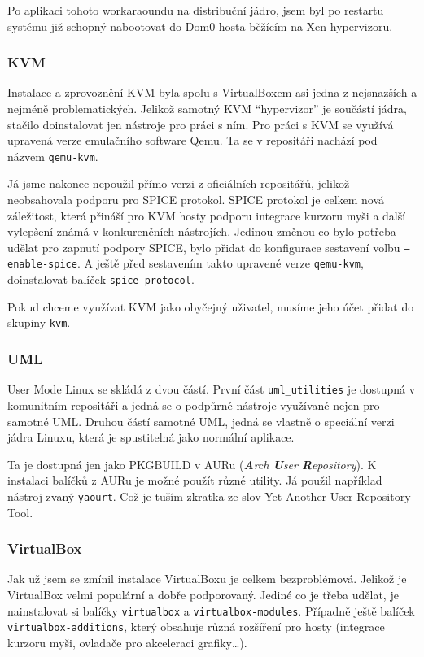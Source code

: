 Po aplikaci tohoto workaraoundu na distribuční jádro, jsem byl po restartu systému již schopný nabootovat do Dom0 hosta běžícím na Xen hypervizoru.

\subsubsection{KVM}
Instalace a zprovoznění KVM byla spolu s VirtualBoxem asi jedna z nejsnazších a nejméně problematických. Jelikož samotný KVM "`hypervizor"' je součástí jádra, stačilo doinstalovat jen nástroje pro práci s ním. Pro práci s KVM se využívá upravená verze emulačního software Qemu. Ta se v repositáři nachází pod názvem \texttt{qemu-kvm}.

Já jsme nakonec nepoužil přímo verzi z oficiálních repositářů, jelikož neobsahovala podporu pro SPICE protokol. SPICE protokol je celkem nová záležitost, která přináší pro KVM hosty podporu integrace kurzoru myši a další vylepšení známá v konkurenčních nástrojích. Jedinou změnou co bylo potřeba udělat pro zapnutí podpory SPICE, bylo přidat do konfigurace sestavení volbu \texttt{---enable-spice}. A ještě před sestavením takto upravené verze \texttt{qemu-kvm}, doinstalovat balíček \texttt{spice-protocol}.

Pokud chceme využívat KVM jako obyčejný uživatel, musíme jeho účet přidat do skupiny \texttt{kvm}.

\subsubsection{UML}
User Mode Linux se skládá z dvou částí. První část \texttt{uml\_utilities} je dostupná v komunitním repositáři a jedná se o podpůrné nástroje využívané nejen pro samotné UML. Druhou částí samotné UML, jedná se vlastně o speciální verzi jádra Linuxu, která je spustitelná jako normální aplikace.

 Ta je dostupná jen jako PKGBUILD v AURu (\textit{\textbf{A}rch \textbf{U}ser \textbf{R}epository}). K instalaci balíčků z AURu je možné použít různé utility. Já použil například nástroj zvaný \texttt{yaourt}. Což je tuším zkratka ze slov Yet Another User Repository Tool.
\subsubsection{VirtualBox}
Jak už jsem se zmínil instalace VirtualBoxu je celkem bezproblémová. Jelikož je VirtualBox velmi populární a dobře podporovaný. Jediné co je třeba udělat, je nainstalovat si balíčky \texttt{virtualbox} a \texttt{virtualbox-modules}. Případně ještě balíček \texttt{virtualbox-additions}, který obsahuje různá rozšíření pro hosty (integrace kurzoru myši, ovladače pro akceleraci grafiky\dots).

